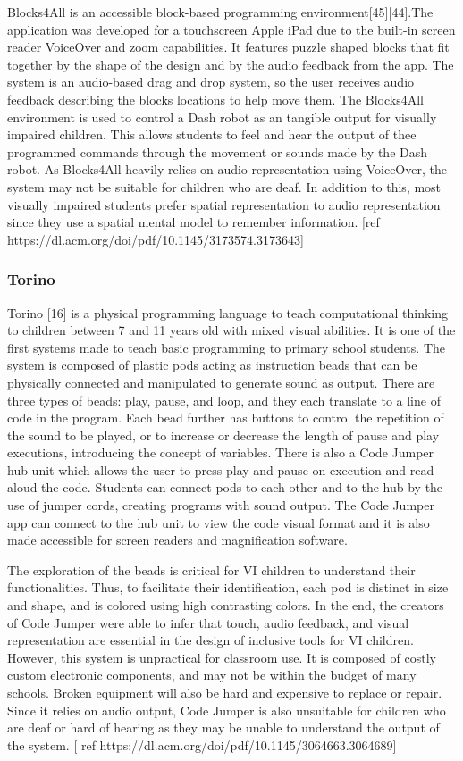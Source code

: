 \documentclass[oneside,%
                    author={Malak Hajji},
                    degree={BSc},
                    title={Designing An Accessible Computational Toolkit For Students},
                  subtitle={With Mixed Visual Abilities}]{dissertation}
\begin{document}
Blocks4All is an accessible block-based programming environment[45][44].The application was developed for a touchscreen Apple iPad due to the built-in screen reader VoiceOver and zoom capabilities. It features puzzle shaped blocks that fit together by the shape of the design and by the audio feedback from the app. The system is an audio-based drag and drop system, so the user receives audio feedback describing the blocks locations to help move them. The Blocks4All environment is used to control a Dash robot as an tangible output for visually impaired children. This allows students to feel and hear the output of thee programmed commands through the movement or sounds made by the Dash robot. As Blocks4All heavily relies on audio representation using VoiceOver, the system may not be suitable for children who are deaf. In addition to this, most visually impaired students prefer spatial representation to audio representation since they use a spatial mental model to remember information. [ref https://dl.acm.org/doi/pdf/10.1145/3173574.3173643]

\subsubsection{Torino}
Torino [16] is a physical programming language to teach computational thinking to children between 7 and 11 years old with mixed visual abilities. It is one of the first systems made to teach basic programming to primary school students. The system is composed of plastic pods acting as instruction beads that can be physically connected and manipulated to generate sound as output. There are three types of beads: play, pause, and loop, and they each translate to a line of code in the program. Each bead further has buttons to control the repetition of the sound to be played, or to increase or decrease the length of pause and play executions, introducing the concept of variables. There is also a Code Jumper hub unit which allows the user to press play and pause on execution and read aloud the code. Students can connect pods to each other and to the hub by the use of jumper cords, creating programs with sound output. The Code Jumper app can connect to the hub unit to view the code visual format and it is also made accessible for screen readers and magnification software.  

The exploration of the beads is  critical for VI children to understand their functionalities. Thus, to facilitate their identification, each pod is distinct in size and shape, and is colored using high contrasting colors. In the end, the creators of Code Jumper were able to infer that touch, audio feedback, and visual representation are essential in the design of inclusive tools for VI children.
However, this system is unpractical for classroom use. It is composed of costly custom electronic components, and may not be within the budget of many schools. Broken equipment will also be hard and expensive to replace or repair. Since it relies on audio output, Code Jumper is also unsuitable for children who are deaf or hard of hearing as they may be unable to understand the output of the system. [ ref https://dl.acm.org/doi/pdf/10.1145/3064663.3064689]
\end{document}
